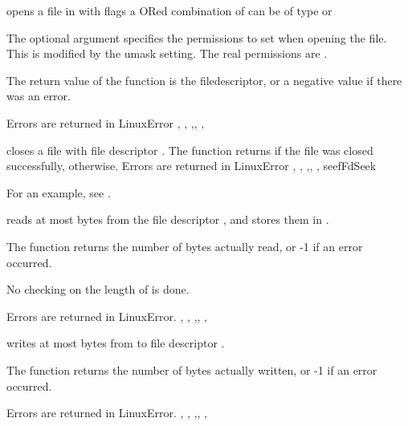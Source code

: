 {  opens a file in  with flags  a ORed combination of
    can be of type  or

  The optional  argument specifies the permissions to set when opening
  the file. This is modified by the umask setting. The real permissions are
  .

  The return value of the function is the filedescriptor, or a negative 
  value if there was an error.
}
{Errors are returned in LinuxError}
{, , ,,
, }



{
 closes a file with file descriptor . The function
returns  if the file was closed successfully, 
otherwise. 
}
{Errors are returned in LinuxError}
{, , ,,
, seef{FdSeek}}

For an example, see .

{  reads at most  bytes from the file descriptor
, and stores them in . 

The function returns the number of bytes actually read, or -1 if
an error occurred.

No checking on the length of  is done.
}
{Errors are returned in LinuxError.}
{, , ,,
, }



{ writes at most  bytes from  to
file descriptor .

The function returns the number of bytes actually written, or -1 if an error
occurred.
}
{Errors are returned in LinuxError.}
{, , ,,
, }

